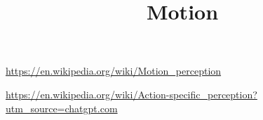 \documentclass[a4paper]{article}
\title{Motion}
\date{}
\begin{document}
\maketitle
    \url{https://en.wikipedia.org/wiki/Motion_perception}
    
    \url{https://en.wikipedia.org/wiki/Action-specific_perception?utm_source=chatgpt.com}
\end{document}
